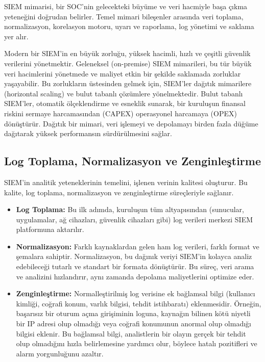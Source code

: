 SIEM mimarisi, bir SOC'nin gelecekteki büyüme ve veri hacmiyle başa çıkma yeteneğini doğrudan belirler. Temel mimari bileşenler arasında veri toplama, normalizasyon, korelasyon motoru, uyarı ve raporlama, log yönetimi ve saklama yer alır.

Modern bir SIEM'in en büyük zorluğu, yüksek hacimli, hızlı ve çeşitli güvenlik verilerini yönetmektir. Geleneksel (on-premise) SIEM mimarileri, bu tür büyük veri hacimlerini yönetmede ve maliyet etkin bir şekilde saklamada zorluklar yaşayabilir. Bu zorlukların üstesinden gelmek için, SIEM'ler dağıtık mimarilere (horizontal scaling) ve bulut tabanlı çözümlere yönelmektedir. Bulut tabanlı SIEM'ler, otomatik ölçeklendirme ve esneklik sunarak, bir kuruluşun finansal riskini sermaye harcamasından (CAPEX) operasyonel harcamaya (OPEX) dönüştürür. Dağıtık bir mimari, veri işlemeyi ve depolamayı birden fazla düğüme dağıtarak yüksek performansın sürdürülmesini sağlar.

\subsection{Log Toplama, Normalizasyon ve Zenginleştirme}

SIEM'in analitik yeteneklerinin temelini, işlenen verinin kalitesi oluşturur. Bu kalite, log toplama, normalizasyon ve zenginleştirme süreçleriyle sağlanır.

\begin{itemize}
    \item \textbf{Log Toplama:} Bu ilk adımda, kuruluşun tüm altyapısından (sunucular, uygulamalar, ağ cihazları, güvenlik cihazları gibi) log verileri merkezi SIEM platformuna aktarılır.
    \item \textbf{Normalizasyon:} Farklı kaynaklardan gelen ham log verileri, farklı format ve şemalara sahiptir. Normalizasyon, bu dağınık veriyi SIEM'in kolayca analiz edebileceği tutarlı ve standart bir formata dönüştürür. Bu süreç, veri arama ve analizini hızlandırır, aynı zamanda depolama maliyetlerini optimize eder.
    \item \textbf{Zenginleştirme:} Normalleştirilmiş log verisine ek bağlamsal bilgi (kullanıcı kimliği, coğrafi konum, varlık bilgisi, tehdit istihbaratı) eklenmesidir. Örneğin, başarısız bir oturum açma girişiminin loguna, kaynağın bilinen kötü niyetli bir IP adresi olup olmadığı veya coğrafi konumunun anormal olup olmadığı bilgisi eklenir. Bu bağlamsal bilgi, analistlerin bir olayın gerçek bir tehdit olup olmadığını hızla belirlemesine yardımcı olur, böylece hatalı pozitifleri ve alarm yorgunluğunu azaltır.
\end{itemize}

